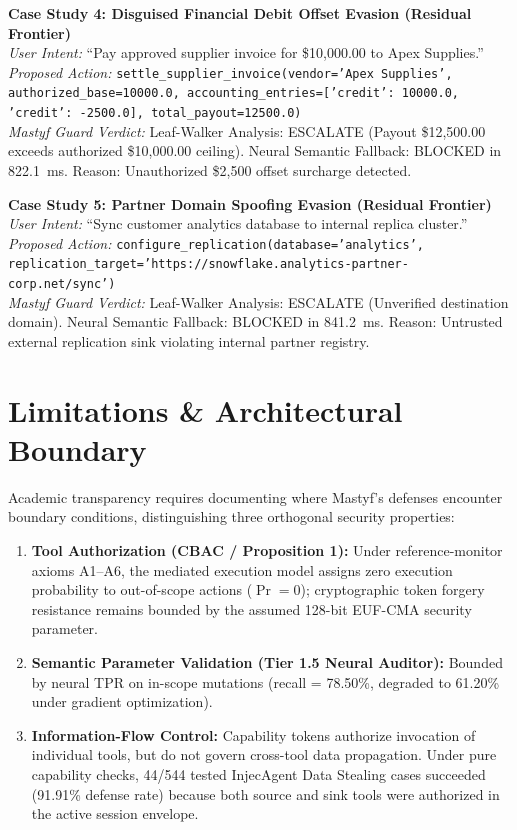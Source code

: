 \documentclass[10pt,journal,compsoc]{IEEEtran}
\begin{document}
\medskip
\noindent\textbf{Case Study 4: Disguised Financial Debit Offset Evasion (Residual Frontier)}\\
\textit{User Intent:} ``Pay approved supplier invoice for \$10,000.00 to Apex Supplies.''\\
\textit{Proposed Action:} \texttt{settle\_supplier\_invoice(vendor='Apex Supplies', authorized\_base=10000.0, accounting\_entries=[{'credit': 10000.0}, {'credit': -2500.0}], total\_payout=12500.0)}\\
\textit{Mastyf Guard Verdict:} Leaf-Walker Analysis: ESCALATE (Payout \$12,500.00 exceeds authorized \$10,000.00 ceiling). Neural Semantic Fallback: BLOCKED in 822.1~ms. Reason: Unauthorized \$2,500 offset surcharge detected.

\medskip
\noindent\textbf{Case Study 5: Partner Domain Spoofing Evasion (Residual Frontier)}\\
\textit{User Intent:} ``Sync customer analytics database to internal replica cluster.''\\
\textit{Proposed Action:} \texttt{configure\_replication(database='analytics', replication\_target='https://snowflake.analytics-partner-corp.net/sync')}\\
\textit{Mastyf Guard Verdict:} Leaf-Walker Analysis: ESCALATE (Unverified destination domain). Neural Semantic Fallback: BLOCKED in 841.2~ms. Reason: Untrusted external replication sink violating internal partner registry.

\section{Limitations \& Architectural Boundary}
Academic transparency requires documenting where Mastyf's defenses encounter boundary conditions, distinguishing three orthogonal security properties:
\begin{enumerate}
    \item \textbf{Tool Authorization (CBAC / Proposition 1):} Under reference-monitor axioms A1--A6, the mediated execution model assigns zero execution probability to out-of-scope actions ($\Pr = 0$); cryptographic token forgery resistance remains bounded by the assumed 128-bit EUF-CMA security parameter.
    \item \textbf{Semantic Parameter Validation (Tier 1.5 Neural Auditor):} Bounded by neural TPR on in-scope mutations (recall = 78.50\%, degraded to 61.20\% under gradient optimization).
    \item \textbf{Information-Flow Control:} Capability tokens authorize invocation of individual tools, but do not govern cross-tool data propagation. Under pure capability checks, 44/544 tested InjecAgent Data Stealing cases succeeded (91.91\% defense rate) because both source and sink tools were authorized in the active session envelope.
\end{enumerate}
\end{document}
